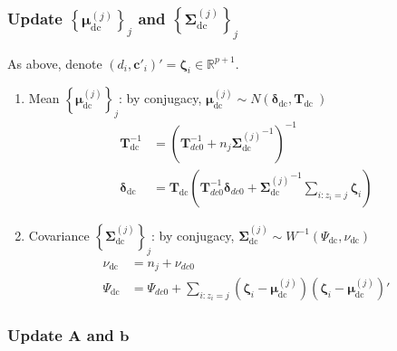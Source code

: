 \documentclass[]{article}
\begin{document}
\subsubsection{Update \(\left\{ \mathbf{\mu}_{\text{dc}}^{(j)} \right\}_{j}\) and \(\left\{ \mathbf{\Sigma}_{\text{dc}}^{(j)} \right\}_{j}\)} \label{loading prior}
As above, denote \(\left( d_{i},\mathbf{c}'_{i} \right)' = \bm{\zeta}_{i} \in \mathbb{R}^{p + 1}\).
\begin{enumerate}
	\def\labelenumi{(\arabic{enumi})}
	\item
	Mean \(\left\{ \bm{\mu}_{\text{dc}}^{(j)} \right\}_{j}\): by
	conjugacy, \(\bm{\mu}_{\text{dc}}^{(j)} \sim N\left( \bm{\delta}_{\text{dc}},\mathbf{T}_{\text{dc}}\  \right)\)
	\begin{align*}
		\mathbf{T}_{\text{dc}}^{- 1} &= \left( \mathbf{T}_{dc0}^{- 1} + n_{j}{\mathbf{\Sigma}_{\text{dc}}^{(j)}}^{- 1} \right)^{- 1}\\
		\bm{\delta}_{\text{dc}} &= \mathbf{T}_{\text{dc}}\left( \mathbf{T}_{dc0}^{- 1}\bm{\delta}_{dc0} + {\mathbf{\Sigma}_{\text{dc}}^{(j)}}^{- 1}\sum_{i:z_{i} = j}^{}\bm{\zeta}_{i} \right)
	\end{align*}
	\item
	Covariance \(\left\{ \mathbf{\Sigma}_{\text{dc}}^{(j)} \right\}_{j}\): by conjugacy, \(\mathbf{\Sigma}_{\text{dc}}^{(j)} \sim W^{- 1}\left( \Psi_{\text{dc}},\nu_{\text{dc}} \right)\)
	\begin{align*}
		\nu_{\text{dc}} &= n_{j} + \nu_{dc0}\\
		\Psi_{\text{dc}} &= \Psi_{dc0} + \sum_{i:z_{i} = j}^{}{\left( \bm{\zeta}_{i} - \bm{\mu}_{\text{dc}}^{(j)} \right)\left( \bm{\zeta}_{i} - \bm{\mu}_{\text{dc}}^{(j)} \right)'}
	\end{align*}
\end{enumerate}

\subsubsection{Update \(\mathbf{A}\) and \(\mathbf{b}\)} \label{dynamics update}
\end{document}
